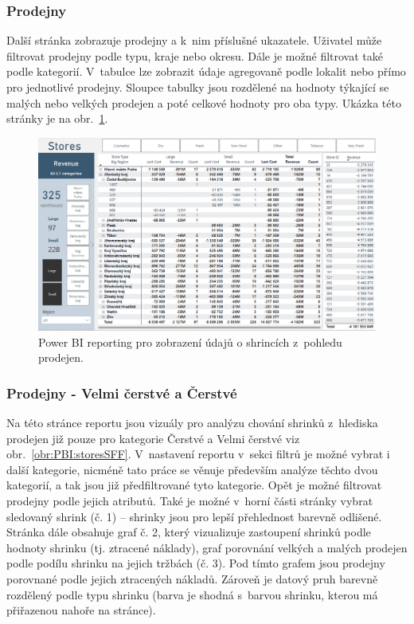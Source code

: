 \subsubsection*{Prodejny}

Další stránka zobrazuje prodejny a k~nim příslušné ukazatele. Uživatel může filtrovat prodejny podle typu, kraje nebo okresu. Dále je možné filtrovat také podle kategorií. V~tabulce lze zobrazit údaje agregovaně podle lokalit nebo přímo pro jednotlivé prodejny. Sloupce tabulky jsou rozdělené na hodnoty týkající se malých nebo velkých prodejen a poté celkové hodnoty pro oba typy. Ukázka této stránky je na obr.~\ref*{obr:PBI:stores}.

\begin{figure}[h!]
    \centering
    \captionsetup{justification=centering}
    \includegraphics[width=\textwidth]{obrazky/PBI/stores.png}
    \caption{Power BI reporting pro zobrazení údajů o shrincích z~pohledu prodejen.}
    \label{obr:PBI:stores}
\end{figure}

\subsubsection*{Prodejny - Velmi čerstvé a Čerstvé}

Na této stránce reportu jsou vizuály pro analýzu chování shrinků z~hlediska prodejen již pouze pro kategorie Čerstvé a Velmi čerstvé viz obr.~\ref*{obr:PBI:storesSFF}. V~nastavení reportu v~sekci filtrů je možné vybrat i další kategorie, nicméně tato práce se věnuje především analýze těchto dvou kategorií, a tak jsou již předfiltrované tyto kategorie. Opět je možné filtrovat prodejny podle jejich atributů. Také je možné v~horní části stránky vybrat sledovaný shrink (č. 1) -- shrinky jsou pro lepší přehlednost barevně odlišené. 
Stránka dále obsahuje graf č. 2, který vizualizuje zastoupení shrinků podle hodnoty shrinku (tj. ztracené náklady), graf porovnání velkých a malých prodejen podle podílu shrinku na jejich tržbách (č. 3). Pod tímto grafem jsou prodejny porovnané podle jejich ztracených nákladů. Zároveň je datový pruh barevně rozdělený podle typu shrinku (barva je shodná s~barvou shrinku, kterou má přiřazenou nahoře na stránce). 

